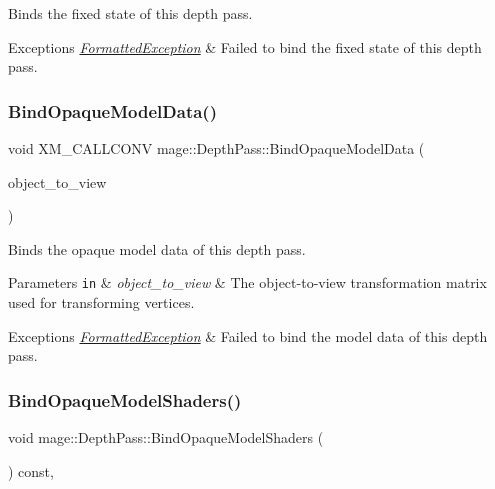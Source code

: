 Binds the fixed state of this depth pass.


\begin{DoxyExceptions}{Exceptions}
{\em \hyperlink{classmage_1_1_formatted_exception}{Formatted\+Exception}} & Failed to bind the fixed state of this depth pass. \\
\hline
\end{DoxyExceptions}
\hypertarget{classmage_1_1_depth_pass_a674fc5fe2e8cae4c704a554dc8bc1fdd}{}\label{classmage_1_1_depth_pass_a674fc5fe2e8cae4c704a554dc8bc1fdd} 
\subsubsection{\texorpdfstring{Bind\+Opaque\+Model\+Data()}{BindOpaqueModelData()}}
{\footnotesize\ttfamily void X\+M\+\_\+\+C\+A\+L\+L\+C\+O\+NV mage\+::\+Depth\+Pass\+::\+Bind\+Opaque\+Model\+Data (\begin{DoxyParamCaption}\item[{F\+X\+M\+M\+A\+T\+R\+IX}]{object\+\_\+to\+\_\+view }\end{DoxyParamCaption})\hspace{0.3cm}{\ttfamily [private]}}

Binds the opaque model data of this depth pass.


\begin{DoxyParams}[1]{Parameters}
\mbox{\tt in}  & {\em object\+\_\+to\+\_\+view} & The object-\/to-\/view transformation matrix used for transforming vertices. \\
\hline
\end{DoxyParams}

\begin{DoxyExceptions}{Exceptions}
{\em \hyperlink{classmage_1_1_formatted_exception}{Formatted\+Exception}} & Failed to bind the model data of this depth pass. \\
\hline
\end{DoxyExceptions}
\hypertarget{classmage_1_1_depth_pass_a6e10b136e64265fa36b9152353946bdc}{}\label{classmage_1_1_depth_pass_a6e10b136e64265fa36b9152353946bdc} 
\subsubsection{\texorpdfstring{Bind\+Opaque\+Model\+Shaders()}{BindOpaqueModelShaders()}}
{\footnotesize\ttfamily void mage\+::\+Depth\+Pass\+::\+Bind\+Opaque\+Model\+Shaders (\begin{DoxyParamCaption}{ }\end{DoxyParamCaption}) const\hspace{0.3cm}{\ttfamily [private]}, {\ttfamily [noexcept]}}

